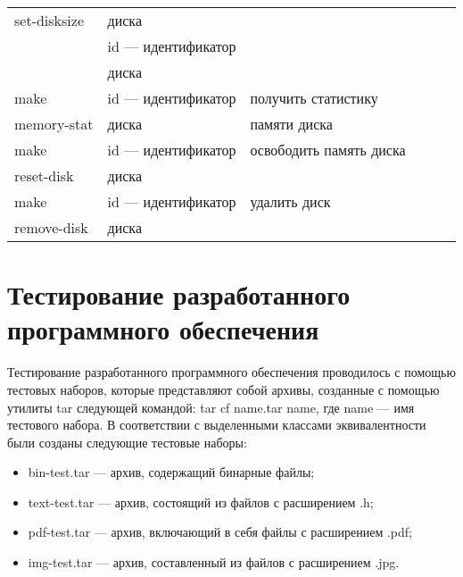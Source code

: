 \begin{table}[h]
\begin{center}
\begin{tabular}{|l|l|l|l|l|l|}
            \multicolumn{1}{|l}{set-disksize} & \multicolumn{1}{|l}{диска} & \multicolumn{1}{|l|}{} \\
            \multicolumn{1}{|l}{} & \multicolumn{1}{|l}{id --- идентификатор} & \multicolumn{1}{|l|}{} \\
            \multicolumn{1}{|l}{} & \multicolumn{1}{|l}{диска} & \multicolumn{1}{|l|}{} \\ \hline
            \multicolumn{1}{|l}{make} & \multicolumn{1}{|l}{id --- идентификатор} & \multicolumn{1}{|l|}{получить статистику} \\
            \multicolumn{1}{|l}{memory-stat} & \multicolumn{1}{|l}{диска} & \multicolumn{1}{|l|}{памяти диска} \\ \hline
            \multicolumn{1}{|l}{make} & \multicolumn{1}{|l}{id --- идентификатор} & \multicolumn{1}{|l|}{освободить память диска} \\
            \multicolumn{1}{|l}{reset-disk} & \multicolumn{1}{|l}{диска} & \multicolumn{1}{|l|}{} \\ \hline
            \multicolumn{1}{|l}{make} & \multicolumn{1}{|l}{id --- идентификатор} & \multicolumn{1}{|l|}{удалить диск} \\
            \multicolumn{1}{|l}{remove-disk} & \multicolumn{1}{|l}{диска} & \multicolumn{1}{|l|}{} \\ \hline
        \end{tabular}
    \end{center}
    \label{tab:comparison}
\end{table}

\section{Тестирование разработанного программного обеспечения}

Тестирование разработанного программного обеспечения проводилось с помощью тестовых наборов, которые представляют собой архивы, созданные с помощью утилиты tar \cite{tar} следующей командой: tar cf name.tar name, где name --- имя тестового набора. В соответствии с выделенными классами эквивалентности были созданы следующие тестовые наборы:

\begin{itemize}
    \item bin-test.tar --- архив, содержащий бинарные файлы;
    \item text-test.tar --- архив, состоящий из файлов с расширением .h;
    \item pdf-test.tar --- архив, включающий в себя файлы с расширением .pdf;
    \item img-test.tar --- архив, составленный из файлов с расширением .jpg.
\end{itemize}

